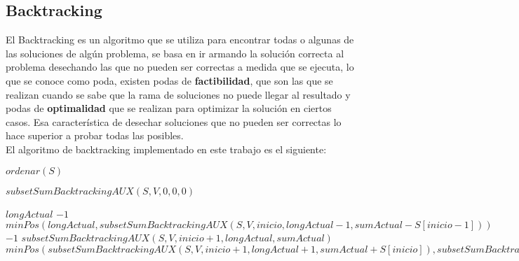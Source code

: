 \documentclass[a4paper]{article}
\begin{document}
\subsection{Backtracking}
El Backtracking es un algoritmo que se utiliza para encontrar todas o algunas de las soluciones de alg\'un problema, se basa en ir armando la soluci\'on correcta al problema desechando las que no pueden ser correctas a medida que se ejecuta, lo que se conoce como poda, existen podas de \textbf{factibilidad}, que son las que se realizan cuando se sabe que la rama de soluciones no puede llegar al resultado y podas de \textbf{optimalidad} que se realizan para optimizar la solución en ciertos casos.
Esa característica de desechar soluciones que no pueden ser correctas lo hace superior a probar todas las posibles.
\\
El algoritmo de backtracking implementado en este trabajo es el siguiente:

\begin{algorithm}
\begin{algorithmic}
		\State $ordenar(S)$
		
		\Return $subsetSumBacktrackingAUX(S, V, 0, 0, 0)$
	\EndProcedure
\end{algorithmic}
\end{algorithm}

\begin{algorithm}
\begin{algorithmic}
				\State \Return $longActual$
			\Else
				\State \Return $-1$
			\EndIf
		\Else
				\State \Return $minPos(longActual,subsetSumBacktrackingAUX(S,V,inicio,longActual-1,sumActual-S[inicio-1]))$
				\State \Return $-1$
				\State \Return $subsetSumBacktrackingAUX(S, V, inicio + 1, longActual, sumActual)$
			\Else
				\State \Return $minPos(subsetSumBacktrackingAUX(S,V,inicio+1, longActual+1, sumActual + S[inicio]), subsetSumBacktrackingAUX(S,V,inicio+1, longActual, sumActual))$
			\EndIf
		\EndIf
	\EndProcedure
\end{algorithmic}
\end{algorithm}
\end{document}
